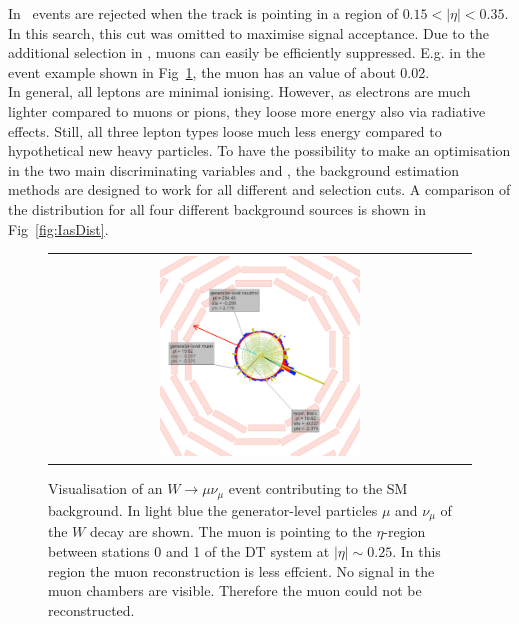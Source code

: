 In~\cite{bib:CMS:DT_Thesis,bib:CMS:DT_8TeV_AN} events are rejected when the track is pointing in a region of $0.15<|\eta|<0.35$.
In this search, this cut was omitted to maximise signal acceptance. 
Due to the additional selection in \ias, muons can easily be efficiently suppressed.
E.g. in the event example shown in Fig~\ref{fig:LostMuon}, the muon has an \ias value of about 0.02.\\


In general, all leptons are minimal ionising.
However, as electrons are much lighter compared to muons or pions, they loose more energy also via radiative effects.
Still, all three lepton types loose much less energy compared to hypothetical new heavy particles.
To have the possibility to make an optimisation in the two main discriminating variables \pt and \ias, the background estimation methods are designed to work for all different \pt and \ias selection cuts.
A comparison of the \ias distribution for all four different background sources is shown in Fig~\ref{fig:IasDist}.
\begin{figure}[!tb]
  \centering 
  \vspace{25pt}
  \begin{tabular}{c}
    \includegraphics[width=0.49\textwidth]{figures/analysis/LostMuon_Lumi_357583_Event_142918834.png}
  \end{tabular}
  \caption{Visualisation of an $W\rightarrow \mu\nu_{\mu}$ event contributing to the SM background. 
           In light blue the generator-level particles $\mu$ and $\nu_{\mu}$ of the $W$ decay are shown. 
           The muon is pointing to the $\eta$-region between stations 0 and 1 of the DT system at $|\eta|\sim0.25$.
           In this region the muon reconstruction is less effcient. No signal in the muon chambers are visible. Therefore the  muon could not be reconstructed.}
  \label{fig:LostMuon}
\vspace{25pt}
\end{figure}

